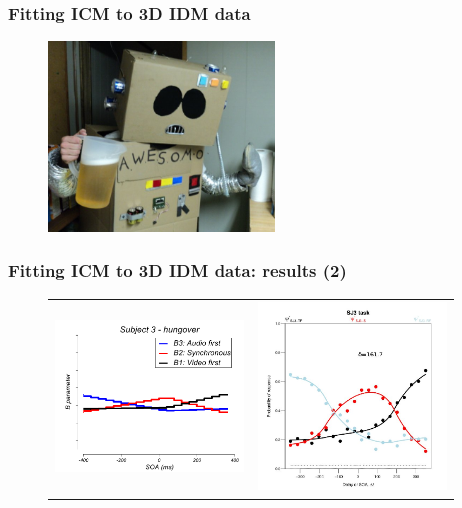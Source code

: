 \documentclass[xcolor={fixpdftex,hyperref,x11names},10pt,pdftex,hyperref={pdftex}]{beamer}
\begin{document}
\begin{frame}
  \frametitle{Fitting ICM to 3D IDM data}
   \begin{figure}[h]
    \includegraphics[width=60mm,totalheight=0.65\textheight]{figs/funny-drunk-guy-robot.jpg}
    \end{figure}
\end{frame}


\begin{frame}
  \frametitle{Fitting ICM to 3D IDM data: results (2)}
   \begin{figure}[h]
      \begin{tabular}{c c}
      \includegraphics[width=50mm,totalheight=0.5\textheight]{figs/sub3_plot_Bs}
      &
      \includegraphics[width=50mm,totalheight=0.5\textheight]{figs/sub3_fitted_model.jpg}
       \end{tabular}
   \end{figure}
\end{frame}
\end{document}
